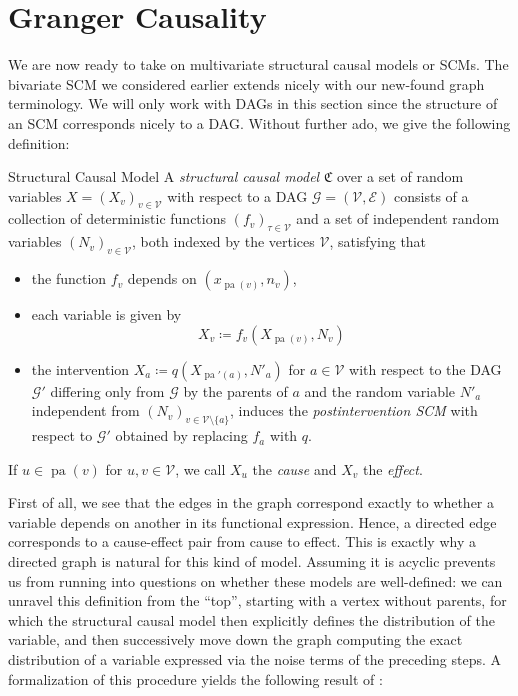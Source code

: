 \documentclass[11pt, a4paper]{memoir}
\theoremstyle{break}
\theoremstyle{break}
\theoremstyle{nonumberplain}
\DeclareMathOperator{\pa}{pa}
\begin{document}
\section{Granger Causality}\label{multiSCM}
We are now ready to take on multivariate structural causal models or SCMs. The bivariate SCM we considered earlier extends nicely with our new-found graph terminology. We will only work with DAGs in this section since the structure of an SCM corresponds nicely to a DAG. Without further ado, we give the following definition:
\begin{mydefinition}{Structural Causal Model}
A \emph{structural causal model} $\mathfrak{C}$ over a set of random variables $X=(X_v)_{v\in \mathcal{V}}$ with respect to a DAG $\mathcal{G}=(\mathcal{V},\mathcal{E})$ consists of a collection of deterministic functions $(f_v)_{\tau\in \mathcal{V}}$ and a set of independent random variables $(N_v)_{v\in \mathcal{V}}$, both indexed by the vertices $\mathcal{V}$, satisfying that
\begin{itemize}
	\item the function $f_v$ depends on $\left(x_{\pa(v)}, n_v\right)$,
	\item each variable is given by
	$$X_v\coloneqq f_v\left(X_{\pa(v)}, N_v\right)$$
	\item the intervention $X_a\coloneqq q\left(X_{\pa'(a)}, N'_a\right)$ for $a\in \mathcal{V}$ with respect to the DAG $\mathcal{G}'$ differing only from $\mathcal{G}$ by the parents of $a$ and the random variable $N'_a$ independent from $(N_v)_{v\in \mathcal{V}\setminus \{a\}}$, induces the \emph{postintervention SCM} with respect to $\mathcal{G}'$ obtained by replacing $f_a$ with $q$.
\end{itemize}
If $u\in \pa(v)$ for $u,v\in \mathcal{V}$, we call $X_u$ the \emph{cause} and $X_v$ the \emph{effect}. 
\end{mydefinition}
\noindent First of all, we see that the edges in the graph correspond exactly to whether a variable depends on another in its functional expression. Hence, a directed edge corresponds to a cause-effect pair from cause to effect. This is exactly why a directed graph is natural for this kind of model. Assuming it is acyclic prevents us from running into questions on whether these models are well-defined: we can unravel this definition from the \enquote{top}, starting with a vertex without parents, for which the structural causal model then explicitly defines the distribution of the variable, and then successively move down the graph computing the exact distribution of a variable expressed via the noise terms of the preceding steps. A formalization of this procedure yields the following result of \cite{Pearl}:
\end{document}
